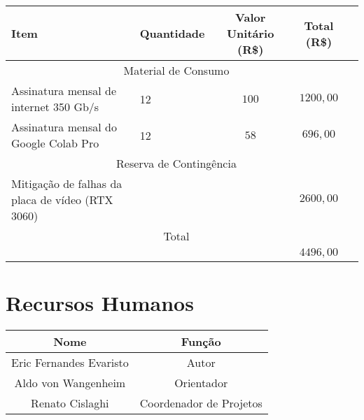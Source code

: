 \noindent \begin{tabular} {|X p{4cm}|c|c|c|}
	\hline
	{\cellcolor{shadecolor}} \textbf{Item}           & {\cellcolor{shadecolor}} \textbf{Quantidade} & {\cellcolor{shadecolor}} \textbf{Valor Unitário (R\$)} & {\cellcolor{shadecolor}} \textbf{Total (R\$)} \\ \hline
	\hline
	\multicolumn{4}{|c|}{Material de Consumo}                                                                                                                                                                \\ \hline
	Assinatura mensal de internet 350 Gb/s           & 12                                           & $100$                                                  & $1200,00$                                     \\ \hline
	Assinatura mensal do Google Colab Pro            & 12                                           & $58$                                                   & $696,00$                                      \\ \hline
	\hline
	\multicolumn{4}{|c|}{Reserva de Contingência}                                                                                                                                                            \\ \hline
	Mitigação de falhas da placa de vídeo (RTX 3060) &                                              &                                                        & $2600,00$                                     \\ \hline
	\hline
	\multicolumn{4}{|c|}{Total}                                                                                                                                                                              \\ \hline
	                                                 &                                              &                                                        & $4496,00$                                     \\ \hline
\end{tabular}

\section{Recursos Humanos}

\noindent \begin{tabular}{|c|c|}
	\arrayrulecolor{white}
	\hline
	\arrayrulecolor{black}
	\hline
	\rowcolor{shadecolor}
	\textbf{Nome}           & \textbf{Função}         \\ \hline
	Eric Fernandes Evaristo & Autor                   \\ \hline
	Aldo von Wangenheim     & Orientador              \\ \hline
	Renato Cislaghi         & Coordenador de Projetos \\ \hline
\end{tabular}

